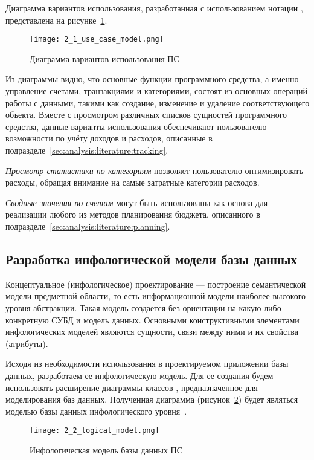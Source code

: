 Диаграмма вариантов использования, разработанная с использованием нотации \uml, представлена на рисунке~\ref{fig:domain:use_cases:model}.

\begin{figure}
    \centering
    \texttt{[image: 2\_1\_use\_case\_model.png]}
    \caption{Диаграмма вариантов использования ПС}
    \label{fig:domain:use_cases:model}
\end{figure}

Из диаграммы видно, что основные функции программного средства, а именно управление счетами, транзакциями и категориями, состоят из основных операций работы с данными, такими как создание, изменение и удаление соответствующего объекта.
Вместе с просмотром различных списков сущностей программного средства, данные варианты использования обеспечивают пользователю возможности по учёту доходов и расходов, описанные в подразделе~\ref{sec:analysis:literature:tracking}.

\emph{Просмотр статистики по категориям} позволяет пользователю оптимизировать расходы, обращая внимание на самые затратные категории расходов.

\emph{Сводные значения по счетам} могут быть использованы как основа для реализации любого из методов планирования бюджета, описанного в подразделе~\ref{sec:analysis:literature:planning}.

\subsection{Разработка инфологической модели базы данных}
\label{sec:domain:db}

Концептуальное (инфологическое) проектирование — построение семантической модели предметной области, то есть информационной модели наиболее высокого уровня абстракции.
Такая модель создается без ориентации на какую-либо конкретную СУБД и модель данных.
Основными конструктивными элементами инфологических моделей являются сущности, связи между ними и их свойства (атрибуты).

Исходя из необходимости использования в проектируемом приложении базы данных, разработаем ее инфологическую модель.
Для ее создания будем использовать расширение диаграммы классов \uml, предназначенное для моделирования баз данных.
Полученная диаграмма (рисунок~\ref{fig:domain:db:model}) будет являться моделью базы данных инфологического уровня~\cite{kulikov_db_workbook}.

\begin{figure}
    \centering
    \texttt{[image: 2\_2\_logical\_model.png]}
    \caption{Инфологическая модель базы данных ПС}
    \label{fig:domain:db:model}
\end{figure}

